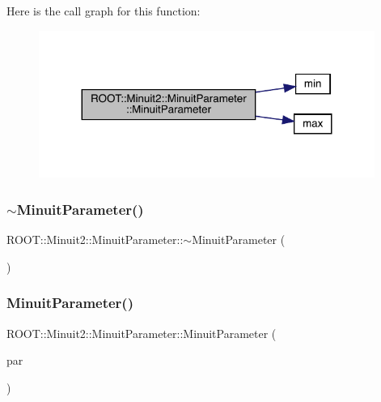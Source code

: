Here is the call graph for this function\+:
\nopagebreak
\begin{figure}[H]
\begin{center}
\leavevmode
\includegraphics[width=311pt]{dd/dfb/classROOT_1_1Minuit2_1_1MinuitParameter_a13b433906347405bf85ef2bdf5803990_cgraph}
\end{center}
\end{figure}
\mbox{\label{classROOT_1_1Minuit2_1_1MinuitParameter_a487d895f06a46c8c2e1e3dbc97dd0a26}} 
\subsubsection{\texorpdfstring{$\sim$MinuitParameter()}{~MinuitParameter()}\hspace{0.1cm}{\footnotesize\ttfamily [2/2]}}
{\footnotesize\ttfamily R\+O\+O\+T\+::\+Minuit2\+::\+Minuit\+Parameter\+::$\sim$\+Minuit\+Parameter (\begin{DoxyParamCaption}{ }\end{DoxyParamCaption})\hspace{0.3cm}{\ttfamily [inline]}}

\mbox{\label{classROOT_1_1Minuit2_1_1MinuitParameter_a0ac95809b18c619597764fcfabcb70fe}} 
\subsubsection{\texorpdfstring{MinuitParameter()}{MinuitParameter()}\hspace{0.1cm}{\footnotesize\ttfamily [8/8]}}
{\footnotesize\ttfamily R\+O\+O\+T\+::\+Minuit2\+::\+Minuit\+Parameter\+::\+Minuit\+Parameter (\begin{DoxyParamCaption}\item[{const \mbox{\hyperlink{classROOT_1_1Minuit2_1_1MinuitParameter}{Minuit\+Parameter}} \&}]{par }\end{DoxyParamCaption})\hspace{0.3cm}{\ttfamily [inline]}}



